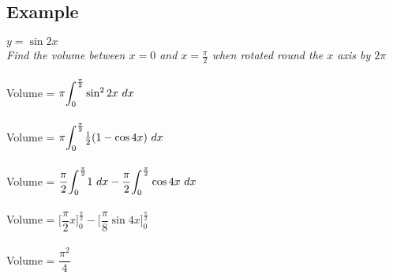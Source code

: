 \documentclass{article}[18pt]
\begin{document}
\subsection{Example}
$y=\sin2x$\\
\textit{Find the volume between $x=0$ and $x=\frac{\pi}{2}$ when rotated round the $x$ axis by $2\pi$}\\
\\
Volume = $\pi\mathlarger{\int_0^\frac{\pi}{2}}\sin^22x \ dx$\\
\\
Volume = $\pi\mathlarger{\int_0^\frac{\pi}{2}}\frac{1}{2}(1-\cos4x) \ dx$\\
\\
Volume = $\dfrac{\pi}{2}\mathlarger{\int_0^\frac{\pi}{2}}1 \ dx - \dfrac{\pi}{2}\mathlarger{\int_0^\frac{\pi}{2}}\cos4x \ dx$\\
\\
Volume = $\Big[\dfrac{\pi}{2}x\Big]^\frac{\pi}{2}_0-\Big[\dfrac{\pi}{8}\sin4x\Big]^\frac{\pi}{2}_0$\\
\\
Volume = $\dfrac{\pi^2}{4}$
\end{document}
